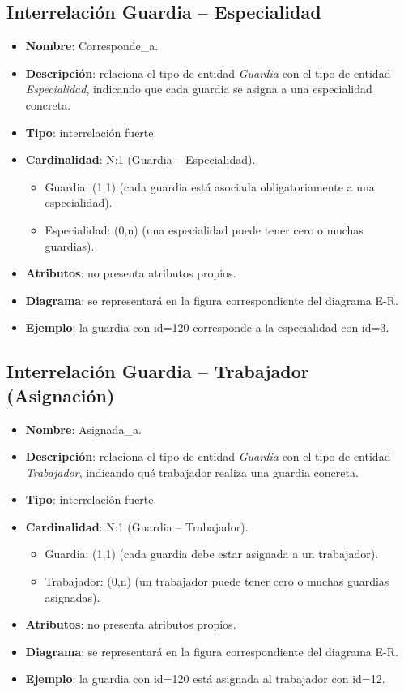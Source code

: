 \subsection{Interrelación Guardia -- Especialidad}
\begin{itemize}
    \item \textbf{Nombre}: Corresponde\_a.
    \item \textbf{Descripción}: relaciona el tipo de entidad \textit{Guardia} con el tipo de entidad \textit{Especialidad},
    indicando que cada guardia se asigna a una especialidad concreta.
    \item \textbf{Tipo}: interrelación fuerte.
    \item \textbf{Cardinalidad}: N:1 (Guardia -- Especialidad).
    \begin{itemize}
        \item Guardia: (1,1) (cada guardia está asociada obligatoriamente a una especialidad).
        \item Especialidad: (0,n) (una especialidad puede tener cero o muchas guardias).
    \end{itemize}
    \item \textbf{Atributos}: no presenta atributos propios.
    \item \textbf{Diagrama}: se representará en la figura correspondiente del diagrama E-R.
    \item \textbf{Ejemplo}: la guardia con id=120 corresponde a la especialidad con id=3.
\end{itemize}

\subsection{Interrelación Guardia -- Trabajador (Asignación)}
\begin{itemize}
    \item \textbf{Nombre}: Asignada\_a.
    \item \textbf{Descripción}: relaciona el tipo de entidad \textit{Guardia} con el tipo de entidad \textit{Trabajador},
    indicando qué trabajador realiza una guardia concreta.
    \item \textbf{Tipo}: interrelación fuerte.
    \item \textbf{Cardinalidad}: N:1 (Guardia -- Trabajador).
    \begin{itemize}
        \item Guardia: (1,1) (cada guardia debe estar asignada a un trabajador).
        \item Trabajador: (0,n) (un trabajador puede tener cero o muchas guardias asignadas).
    \end{itemize}
    \item \textbf{Atributos}: no presenta atributos propios.
    \item \textbf{Diagrama}: se representará en la figura correspondiente del diagrama E-R.
    \item \textbf{Ejemplo}: la guardia con id=120 está asignada al trabajador con id=12.
\end{itemize}

